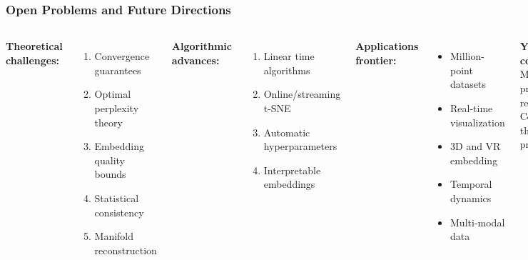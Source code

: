 \documentclass[aspectratio=169]{beamer}
\begin{document}
\begin{frame}
\frametitle{Open Problems and Future Directions}
\begin{columns}[T]
\textbf{Theoretical challenges:}
\begin{enumerate}
\small
\item Convergence guarantees
\item Optimal perplexity theory
\item Embedding quality bounds
\item Statistical consistency
\item Manifold reconstruction
\end{enumerate}

\vspace{0.3cm}
\textbf{Algorithmic advances:}
\begin{enumerate}
\small
\item Linear time algorithms
\item Online/streaming t-SNE
\item Automatic hyperparameters
\item Interpretable embeddings
\end{enumerate}

\textbf{Applications frontier:}
\begin{itemize}
\small
\item Million-point datasets
\item Real-time visualization
\item 3D and VR embedding
\item Temporal dynamics
\item Multi-modal data
\end{itemize}

\vspace{0.3cm}
\textbf{Your contribution?}\\
\small Many problems remain open!\\
Combine theory + practice
\end{columns}
\end{frame}
\end{document}
